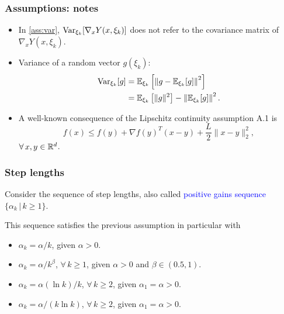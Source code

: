 \documentclass[usepdftitle=false, aspectratio=169]{beamer}
\begin{document}
\begin{frame}
\frametitle{Assumptions: notes}

\begin{itemize}
\item 
In \ref{ass:var}, $\operatorname{Var}_{\xi_k} [\nabla_x Y(x, \xi_k)]$ does not refer to the covariance matrix of $\nabla_x Y(x,  \xi_k)$.
\item
Variance of a random vector $g(\xi_k)$:
\begin{align*}
\operatorname{Var}_{\xi_k} [g] &= {\mathbb{E}}_{\xi_k} \left[ \left \| g - {\mathbb{E}}_{\xi_k} [g] \right \|^2 \right] \\
& = {\mathbb{E}}_{\xi_k} \left[ \| g \|^2 \right] - \left\| {\mathbb{E}}_{\xi_k} [ g ] \right\|^2.
\end{align*}
\item
A well-known consequence of the Lipschitz continuity assumption A.1 is
$$
f(x) \leq f(y) + \nabla f(y)^T ( x - y ) + \frac{L}{2} \| x - y \|^2_2,
$$
$\forall\, x, y \in {\mathbb{R}}^d$.
\end{itemize}

\end{frame}

\begin{frame}
\frametitle{Step lengths}

Consider the sequence of step lengths, also called \textcolor{blue}{positive gains sequence} $\{ \alpha_k \,|\, k \geq 1 \}$.

\mbox{}

This sequence satisfies the previous assumption in particular with
\begin{itemize}
\item 
$\alpha_k = \alpha/k$, given $\alpha > 0$.
\item 
$\alpha_k = \alpha/k^{\beta}$, $\forall\, k \geq 1$, given $\alpha > 0$ and $\beta \in (0.5, 1)$.
\item
$\alpha_k = \alpha(\ln k)/k$, $\forall\, k \geq 2$, given $\alpha_1 = \alpha > 0$.
\item
$\alpha_k = \alpha/(k \ln k)$, $\forall\, k \geq 2$, given $\alpha_1 = \alpha > 0$.
\end{itemize}

\end{frame}
\end{document}
